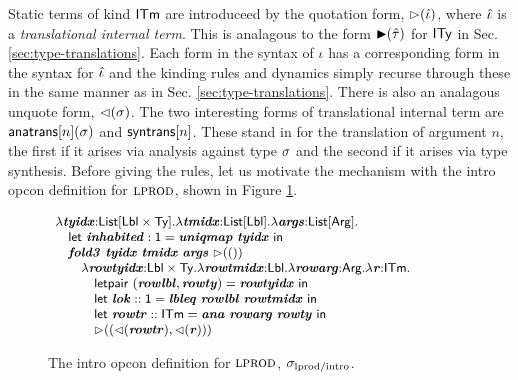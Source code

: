 Static terms of kind ${\sf ITm}$ are introduceed by the quotation form, ${\rhd}(\hat{\iota})$, where $\hat{\iota}$ is a \emph{translational internal term}. This is analagous to the form ${\blacktriangleright}(\hat{\tau})$ for ${\sf ITy}$ in Sec. \ref{sec:type-translations}. Each form in the syntax of $\iota$ has a corresponding form in the syntax for $\hat{\iota}$ and the kinding rules and dynamics simply recurse through these in the same manner as in Sec. \ref{sec:type-translations}. There is also an analagous unquote form, ${\lhd}(\sigma)$. %
The two interesting forms of translational internal term are ${\sf anatrans}[n](\sigma)$ and ${\sf syntrans}[n]$. These stand in for the translation of argument $n$, the first if it arises via analysis against type $\sigma$ and the second if it arises via type synthesis.  Before giving the rules, let us motivate the mechanism with the intro opcon definition for $\textsc{lprod}$, shown in Figure \ref{fig:lprod-intro}.

\begin{figure}\vspace{-8px}
$\small
\begin{array}{l}
\lambda{\textbf{\textit{tyidx}}}{:}{\sf List}[{\sf Lbl}\times{\sf Ty}].\lambda{\textbf{\textit{tmidx}}}{:}{\sf List}[{\sf Lbl}].\lambda{\textbf{\textit{args}}}{:}{\sf List}[{\sf Arg}].\\
\quad {\sf let}~{\textbf{\textit{inhabited}}}:{\sf 1}={\textbf{\textit{uniqmap}}}~{\textbf{\textit{tyidx}}}~{\sf in}\\
\quad {\textbf{\textit{fold3}}}~{\textbf{\textit{tyidx}}}~{\textbf{\textit{tmidx}}}~{\textbf{\textit{args}}}~{\rhd}(())\\
\quad\quad \lambda {\textbf{\textit{rowtyidx}}}{:}{\sf Lbl}\times{\sf Ty}.\lambda {\textbf{\textit{rowtmidx}}}{:}{\sf Lbl}.\lambda{\textbf{\textit{rowarg}}}{:}{\sf Arg}.\lambda {\textbf{\textit{r}}}{:}{\sf ITm}.\\
\quad\quad\quad {\sf letpair}~({\textbf{\textit{rowlbl}}}, {\textbf{\textit{rowty}}})={\textbf{\textit{rowtyidx}}} ~{\sf in}\\
\quad\quad\quad {\sf let}~{\textbf{\textit{lok}}}::{\sf 1}={\textbf{\textit{lbleq}}}~{\textbf{\textit{rowlbl}}} ~{\textbf{\textit{rowtmidx}}}~{\sf in}\\
\quad\quad\quad {\sf let}~{\textbf{\textit{rowtr}}} :: {\sf ITm} = {\textbf{\textit{ana}}}~{\textbf{\textit{rowarg}}}~{\textbf{\textit{rowty}}}~{\sf in}\\
\quad\quad\quad {\rhd}(({\lhd}({\textbf{\textit{rowtr}}}), {\lhd}({\textbf{\textit{r}}}))
)\end{array}$
\caption{The intro opcon definition for $\textsc{lprod}$, $\sigma_\text{lprod/intro}$.}
\label{fig:lprod-intro}\vspace{-10px}
\end{figure}

